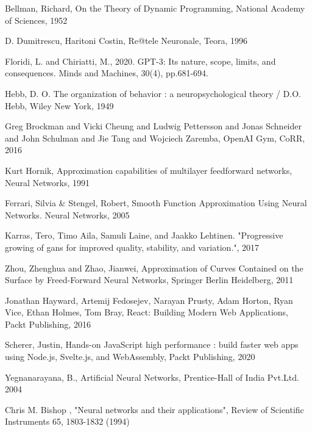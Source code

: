 


\begin{thebibliography}{99}

 Bellman, Richard, On the Theory of Dynamic Programming, National Academy of Sciences, 1952

 D. Dumitrescu, Haritoni Costin, Re@tele Neuronale, Teora, 1996

 Floridi, L. and Chiriatti, M., 2020. GPT-3: Its nature, scope, limits, and consequences. Minds and Machines, 30(4), pp.681-694.

 Hebb, D. O.  The organization of behavior : a neuropsychological theory / D.O. Hebb, Wiley New York, 1949

 Greg Brockman and Vicki Cheung and Ludwig Pettersson and Jonas Schneider and John Schulman and Jie Tang and Wojciech Zaremba, OpenAI Gym, CoRR, 2016

 Kurt Hornik, Approximation capabilities of multilayer feedforward networks, Neural Networks, 1991

	Ferrari, Silvia \& Stengel, Robert, Smooth Function Approximation Using Neural Networks. Neural Networks, 2005 

 Karras, Tero, Timo Aila, Samuli Laine, and Jaakko Lehtinen. "Progressive growing of gans for improved quality, stability, and variation.", 2017

 Zhou, Zhenghua and Zhao, Jianwei, Approximation of Curves Contained on the Surface by Freed-Forward Neural Networks, Springer Berlin Heidelberg, 2011

 Jonathan Hayward, Artemij Fedosejev, Narayan Prusty, Adam Horton, Ryan Vice, Ethan Holmes, Tom Bray, React: Building Modern Web Applications, Packt Publishing, 2016

 Scherer, Justin, Hands-on JavaScript high performance : build faster web apps using Node.js, Svelte.js, and WebAssembly, Packt Publishing, 2020

 Yegnanarayana, B., Artificial Neural Networks, Prentice-Hall of India Pvt.Ltd. 2004

 Chris M. Bishop , "Neural networks and their applications", Review of Scientific Instruments 65, 1803-1832 (1994)




\end{thebibliography}
